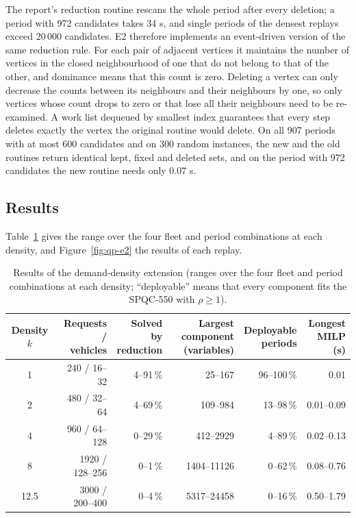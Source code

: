 The report's reduction routine rescans the whole period after every deletion; a period with 972 candidates takes 34 s, and single periods of the densest replays exceed 20\,000 candidates. E2 therefore implements an event-driven version of the same reduction rule. For each pair of adjacent vertices it maintains the number of vertices in the closed neighbourhood of one that do not belong to that of the other, and dominance means that this count is zero. Deleting a vertex can only decrease the counts between its neighbours and their neighbours by one, so only vertices whose count drops to zero or that lose all their neighbours need to be re-examined. A work list dequeued by smallest index guarantees that every step deletes exactly the vertex the original routine would delete. On all 907 periods with at most 600 candidates and on 300 random instances, the new and the old routines return identical kept, fixed and deleted sets, and on the period with 972 candidates the new routine needs only 0.07 s.

\subsection{Results}
Table~\ref{tab:qp-e2} gives the range over the four fleet and period combinations at each density, and Figure~\ref{fig:qp-e2} the results of each replay.

\begin{table}[htbp]\centering\small\setlength{\tabcolsep}{5pt}
\caption{Results of the demand-density extension (ranges over the four fleet and period combinations at each density; ``deployable'' means that every component fits the SPQC-550 with $\rho\geq1$).}\label{tab:qp-e2}
\begin{tabular}{crrrrr}\toprule
\hd{Density\\$k$} & \hd{Requests /\\vehicles} & \hd{Solved by\\reduction} & \hd{Largest component\\(variables)} & \hd{Deployable\\periods} & \hd{Longest\\MILP (s)}\\\midrule
1 & 240 / 16--32 & 4--91\,\% & 25--167 & 96--100\,\% & 0.01\\
2 & 480 / 32--64 & 4--69\,\% & 109--984 & 13--98\,\% & 0.01--0.09\\
4 & 960 / 64--128 & 0--29\,\% & 412--2929 & 4--89\,\% & 0.02--0.13\\
8 & 1920 / 128--256 & 0--1\,\% & 1404--11126 & 0--62\,\% & 0.08--0.76\\
12.5 & 3000 / 200--400 & 0--4\,\% & 5317--24458 & 0--16\,\% & 0.50--1.79\\\bottomrule
\end{tabular}
\end{table}

